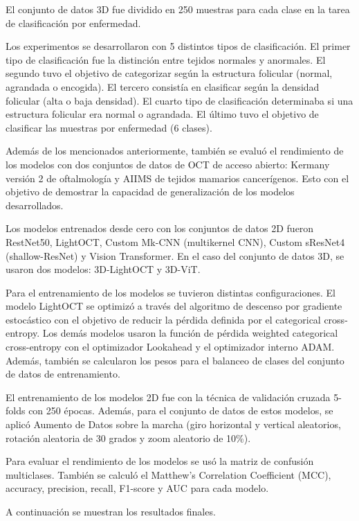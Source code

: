 El conjunto de datos 3D fue dividido en 250 muestras para cada clase en la tarea de clasificación por enfermedad.

Los experimentos se desarrollaron con 5 distintos tipos de clasificación. El primer tipo de clasificación fue la distinción entre tejidos normales y anormales. El segundo tuvo el objetivo de categorizar según la estructura folicular (normal, agrandada o encogida). El tercero consistía en clasificar según la densidad folicular (alta o baja densidad). El cuarto tipo de clasificación determinaba si una estructura folicular era normal o agrandada. El último tuvo el objetivo de clasificar las muestras por enfermedad (6 clases).

Además de los mencionados anteriormente, también se evaluó el rendimiento de los modelos con dos conjuntos de datos de OCT de acceso abierto: Kermany versión 2 de oftalmología y AIIMS de tejidos mamarios cancerígenos. Esto con el objetivo de demostrar la capacidad de generalización de los modelos desarrollados.

Los modelos entrenados desde cero con los conjuntos de datos 2D fueron RestNet50, LightOCT, Custom Mk-CNN (multikernel CNN), Custom sResNet4 (shallow-ResNet) y Vision Transformer. En el caso del conjunto de datos 3D, se usaron dos modelos: 3D-LightOCT y 3D-ViT.

Para el entrenamiento de los modelos se tuvieron distintas configuraciones. El modelo LightOCT se optimizó a través del algoritmo de descenso por gradiente estocástico con el objetivo de reducir la pérdida definida por el categorical cross-entropy. Los demás modelos usaron la función de pérdida weighted categorical cross-entropy con el optimizador Lookahead y el optimizador interno ADAM. Además, también se calcularon los pesos para el balanceo de clases del conjunto de datos de entrenamiento.

El entrenamiento de los modelos 2D fue con la técnica de validación cruzada 5-folds con 250 épocas. Además, para el conjunto de datos de estos modelos, se aplicó Aumento de Datos sobre la marcha (giro horizontal y vertical aleatorios, rotación aleatoria de 30 grados y zoom aleatorio de 10\%).

Para evaluar el rendimiento de los modelos se usó la matriz de confusión multiclases. También se calculó el Matthew’s Correlation Coefficient (MCC), accuracy, precision, recall, F1-score y AUC para cada modelo.

A continuación se muestran los resultados finales.

